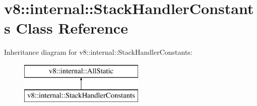 \hypertarget{classv8_1_1internal_1_1_stack_handler_constants}{}\section{v8\+:\+:internal\+:\+:Stack\+Handler\+Constants Class Reference}
\label{classv8_1_1internal_1_1_stack_handler_constants}
Inheritance diagram for v8\+:\+:internal\+:\+:Stack\+Handler\+Constants\+:\begin{figure}[H]
\begin{center}
\leavevmode
\includegraphics[height=2.000000cm]{classv8_1_1internal_1_1_stack_handler_constants}
\end{center}
\end{figure}
